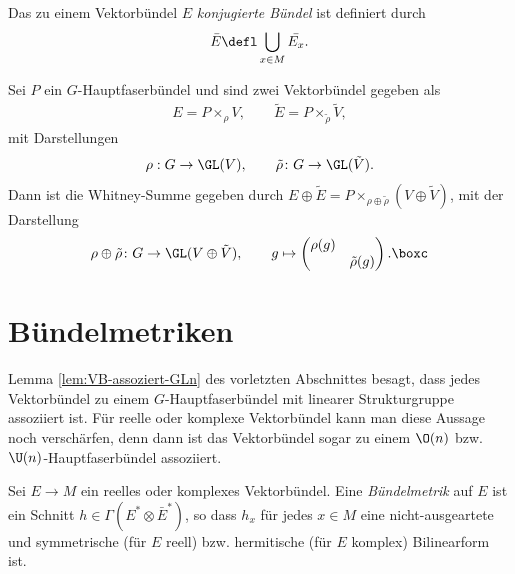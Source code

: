 \documentclass[%
	paper=a5,%
	fleqn,%
	DIV=18,%
	BCOR=0mm,
	fontsize=11pt,
	titlepage=false,%
	bibliography=totoc,
	DIV=18,%
	twoside=true,
	pdftitle=Riemannsche Geometrie,
	pdfauthor=Uwe Semmelmann,
	numbers=noendperiod]%
	{scrbook}
\begin{document}
\begin{defn}
Das zu einem Vektorbündel $E$ \emph{konjugierte Bündel} ist definiert durch
\begin{align*}
\bar{E}\defl\bigcup_{x\in M} \bar{E_x}. 
\end{align*}
\end{defn}


\begin{ex}
Sei $P$ ein $G$-Hauptfaserbündel und sind zwei Vektorbündel gegeben als
\begin{align*}
E = P\times_\rho V,\qquad \tilde{E} = P \times_{\tilde{\rho}} \tilde V,
\end{align*}
mit Darstellungen
\begin{align*}
\rho : G\to \GL(V),\qquad \tilde{\rho}\colon G\to \GL(\tilde V).
\end{align*}
Dann ist die Whitney-Summe gegeben durch $E\oplus \tilde{E} =
P\times_{\rho\oplus \tilde{\rho}} (V\oplus \tilde V)$, mit der Darstellung
\begin{align*}
\rho\oplus\tilde{\rho} \colon G\to \GL(V\oplus \tilde V),\qquad 
g\mapsto 
\begin{pmatrix}
\rho(g)\\
& \tilde{\rho}(g)
\end{pmatrix}.\boxc
\end{align*}
\end{ex}


\section{Bündelmetriken}

Lemma \ref{lem:VB-assoziert-GLn} des vorletzten Abschnittes besagt, dass jedes
Vektorbündel zu einem $G$-Hauptfaserbündel mit linearer Strukturgruppe
assoziiert ist. Für reelle oder komplexe Vektorbündel kann man diese Aussage
noch verschärfen, denn dann ist das Vektorbündel sogar zu einem $\O(n)$ bzw.
$\U(n)$-Hauptfaserbündel assoziiert.

\begin{defn}
Sei $E\to M$ ein reelles oder komplexes Vektorbündel. Eine
\emph{Bündelmetrik} auf $E$ ist ein Schnitt $h\in\Gamma(E^*\otimes \bar{E}^*)$,
so dass $h_x$ für jedes $x\in M$ eine nicht-ausgeartete und symmetrische (für
$E$ reell) bzw. hermitische (für $E$ komplex) Bilinearform ist.\fish
\end{defn}
\end{document}
